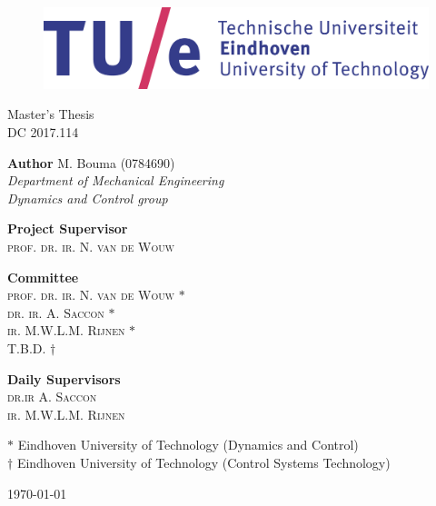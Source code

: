 \documentclass[DC2017114Bouma.tex]{subfiles}
\begin{document}
\begin{figure}[H]
\centering
\begin{minipage}{.495\textwidth}
  \includegraphics[width=0.9\linewidth]{tuelogo.eps}
\end{minipage}
\end{figure}  

\begin{center}

\vspace*{80pt}
\huge{\textbf{\mytitle}}

\vspace*{30pt}
{\LARGE Master's Thesis} \\
{\Large DC 2017.114}

\end{center}

\vspace{\fill}
\begin{minipage}[t]{0.4\textwidth}
	\begin{flushleft} 
		\textbf{Author}
		\vskip3pt
		M. Bouma (0784690)\\
		\textit{Department of Mechanical Engineering\\
			Dynamics and Control group}
	\end{flushleft}
\end{minipage}
\hfill
\begin{minipage}[t]{0.4\textwidth}
	\begin{flushright} 
		\textbf{Project Supervisor}\\
		\textsc{prof. dr. ir. N. van de Wouw}\\
	\end{flushright}
\end{minipage}
\bigskip

\begin{minipage}[t]{0.4\textwidth}
	\begin{flushleft} 
		\textbf{Committee}\\
		\textsc{prof. dr. ir. N. van de Wouw} $*$\\
		\textsc{dr. ir. A. Saccon} $*$\\
		\textsc{ir. M.W.L.M. Rijnen} $*$\\
		\textsc{T.B.D.} $\dagger$
	\end{flushleft}
\end{minipage}
\hfill
\begin{minipage}[t]{0.4\textwidth}
	\begin{flushright} 
		\textbf{Daily Supervisors}\\
		\textsc{dr.ir A. Saccon}\\
		\textsc{ir. M.W.L.M. Rijnen}\\
	\end{flushright}
\end{minipage}
\vfill

{\small $*$ Eindhoven University of Technology (Dynamics and Control)}\\
{\small $\dagger$ Eindhoven University of Technology (Control Systems Technology)}
\bigskip

\today
\end{document}
